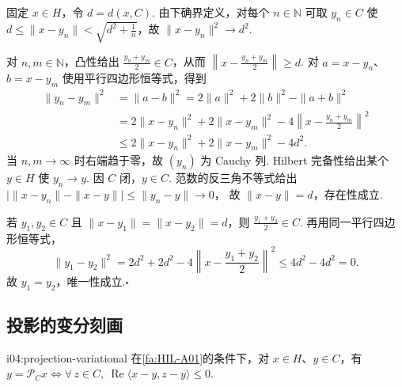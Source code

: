 \begin{FAProof}
固定 \(\displaystyle x\in H\)，令 \(\displaystyle d=d(x,C)\). 由下确界定义，对每个 \(\displaystyle n\in\mathbb N\) 可取 \(\displaystyle y_n\in C\) 使 \(\displaystyle d\leqslant\|x-y_n\|<\sqrt{d^2+\frac{1}{n}}\)，故 \(\displaystyle \|x-y_n\|^2\to d^2\).

对 \(\displaystyle n,m\in\mathbb N\)，凸性给出 \(\displaystyle \frac{y_n+y_m}{2}\in C\)，从而 \(\displaystyle \left\|x-\frac{y_n+y_m}{2}\right\|\geqslant d\).
对 \(\displaystyle a=x-y_n\)、\(\displaystyle b=x-y_m\) 使用平行四边形恒等式，得到
\begin{align*}
\displaystyle \|y_n-y_m\|^2
&\displaystyle =\|a-b\|^2=2\|a\|^2+2\|b\|^2-\|a+b\|^2\\[6pt]
&\displaystyle =2\|x-y_n\|^2+2\|x-y_m\|^2-4\left\|x-\frac{y_n+y_m}{2}\right\|^2\\[6pt]
&\displaystyle \leqslant2\|x-y_n\|^2+2\|x-y_m\|^2-4d^2.
\end{align*}
当 \(\displaystyle n,m\to\infty\) 时右端趋于零，故 \(\displaystyle (y_n)\) 为 Cauchy 列. Hilbert 完备性给出某个 \(\displaystyle y\in H\) 使 \(\displaystyle y_n\to y\). 因 \(\displaystyle C\) 闭，\(\displaystyle y\in C\). 范数的反三角不等式给出 \(\displaystyle \bigl|\|x-y_n\|-\|x-y\|\bigr| \leqslant\|y_n-y\|\to0\)，
故 \(\displaystyle \|x-y\|=d\)，存在性成立.

若 \(\displaystyle y_1,y_2\in C\) 且 \(\displaystyle \|x-y_1\|=\|x-y_2\|=d\)，则 \(\displaystyle \frac{y_1+y_2}{2}\in C\). 再用同一平行四边形恒等式，
\[
\|y_1-y_2\|^2=2d^2+2d^2-4\left\|x-\frac{y_1+y_2}{2}\right\|^2\leqslant4d^2-4d^2=0.
\]
故 \(\displaystyle y_1=y_2\)，唯一性成立.\hfill\(\square\)

\end{FAProof}

\subsection{投影的变分刻画}

\begin{FAProposition}[B][闭凸投影的变分刻画]{i04:projection-variational}
在\autoref{fa:HIL-A01}的条件下，对 \(\displaystyle x\in H\)、\(\displaystyle y\in C\)，有 \(\displaystyle y=\mathcal P_Cx \iff \forall\,z\in C,\ \operatorname{Re}\langle x-y,z-y\rangle\leqslant0\).
\end{FAProposition}

